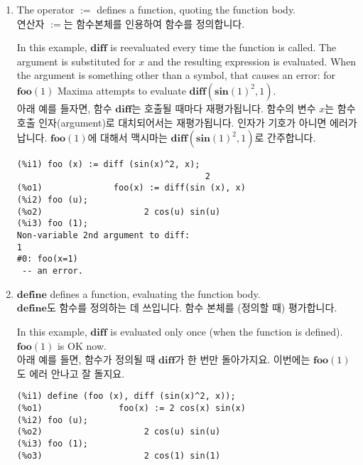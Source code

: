 \documentclass[12pt]{article}
\begin{document}
\begin{enumerate}

\item The operator $\mathbf{:=}$ defines a function, quoting the function body. \\
연산자 $\mathbf{:=}$는 함수본체를 인용하여 함수를 정의합니다. 

In this example, $\mathbf{diff}$ is reevaluated every time the function is called.
The argument is substituted for $x$ and the resulting expression is evaluated.
When the argument is something other than a symbol, that causes an error:
for $\mathbf{foo} (1)$ Maxima attempts to evaluate $\mathbf{diff} (\mathbf{sin}(1)^2, 1)$. \\
아래 예를 들자면, 함수 $\mathbf{diff}$는 호출될 때마다 재평가됩니다.
함수의 변수 $x$는 함수 호출 인자(argument)로 대치되어서는 재평가됩니다. 인자가 기호가 
아니면 에러가 납니다. $\mathbf{foo} (1)$에 대해서 맥시마는 $\mathbf{diff} (\mathbf{sin}(1)^2, 1)$로 간주합니다.

\begin{verbatim}
(%i1) foo (x) := diff (sin(x)^2, x);
                                     2
(%o1)              foo(x) := diff(sin (x), x)
(%i2) foo (u);
(%o2)                    2 cos(u) sin(u)
(%i3) foo (1);
Non-variable 2nd argument to diff:
1
#0: foo(x=1)
 -- an error.
\end{verbatim}

\item $\mathbf{define}$ defines a function, evaluating the function body. \\
$\mathbf{define}$도 함수를 정의하는 데 쓰입니다. 함수 본체를 (정의할 때) 평가합니다.

In this example, $\mathbf{diff}$ is evaluated only once (when the function is defined).
$\mathbf{foo} (1)$ is OK now. \\
아래 예를 들면, 함수가 정의될 때 $\mathbf{diff}$가 한 번만 돌아가지요. 이번에는 $\mathbf{foo} (1)$도 에러 안나고 잘 돌지요. 


\begin{verbatim}
(%i1) define (foo (x), diff (sin(x)^2, x));
(%o1)               foo(x) := 2 cos(x) sin(x)
(%i2) foo (u);
(%o2)                    2 cos(u) sin(u)
(%i3) foo (1);
(%o3)                    2 cos(1) sin(1)
\end{verbatim}

\end{enumerate}
\end{document}
